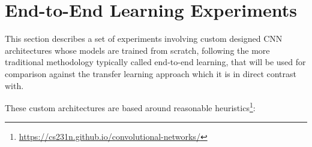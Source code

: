 

\section{End-to-End Learning Experiments}

This section describes a set of experiments involving custom designed \ac{CNN} architectures whose models are trained from scratch, following the more traditional methodology typically called end-to-end learning, that will be used for comparison against the transfer learning approach which it is in direct contrast with.

These custom architectures are based around reasonable heuristics\footnote{\url{https://cs231n.github.io/convolutional-networks/}}:

